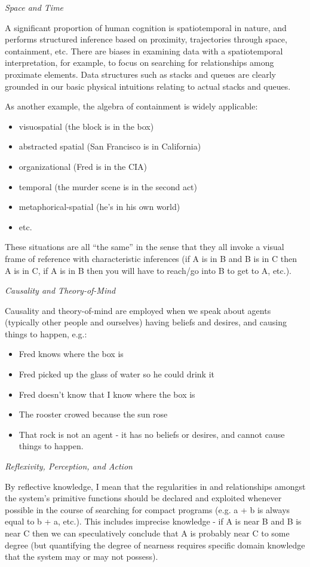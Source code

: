\documentclass[twoside,11pt]{article}
\begin{document}
\emph{Space and Time}

A significant proportion of human cognition is spatiotemporal in nature, and
performs structured inference based on proximity, trajectories through space,
containment, etc. There are biases in examining data with a spatiotemporal
interpretation, for example, to focus on searching for relationships among
proximate elements. Data structures such as stacks and queues are clearly
grounded in our basic physical intuitions relating to actual stacks and queues.

As another example, the algebra of containment is widely
applicable: \begin{itemize}
\item visuospatial (the block is in the box)
\item abstracted spatial (San Francisco is in California)
\item organizational (Fred is in the CIA)
\item temporal (the murder scene is in the second act)
\item metaphorical-spatial (he's in his own world)
\item etc.

\end{itemize}
 These situations are all ``the same'' in the sense that they all invoke a
 visual frame of reference with characteristic inferences (if A is in B and B
 is in C then A is in C, if A is in B then you will have to reach/go into B to
 get to A, etc.).

\emph{Causality and Theory-of-Mind}

Causality and theory-of-mind are employed when we speak about agents (typically
other people and ourselves) having beliefs and desires, and causing things to
happen, e.g.:
 
\begin{itemize}
\item Fred knows where the box is
\item Fred picked up the glass of water so he could drink it
\item Fred doesn't know that I know where the box is
\item The rooster crowed because the sun rose
\item That rock is not an agent - it has no beliefs or desires, and cannot
  cause things to happen.
\end{itemize}

\emph{Reflexivity, Perception, and Action}
 
By reflective knowledge, I mean that the regularities in and relationships
amongst the system's primitive functions should be declared and exploited
whenever possible in the course of searching for compact programs (e.g. a + b
is always equal to b + a, etc.). This includes imprecise knowledge - if A is
near B and B is near C then we can speculatively conclude that A is probably
near C to some degree (but quantifying the degree of nearness requires specific
domain knowledge that the system may or may not possess).
\end{document}
